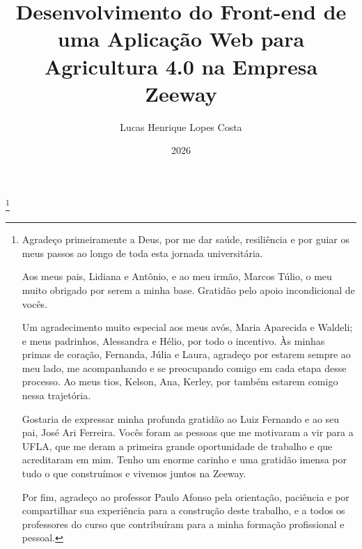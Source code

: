 \documentclass{templufla}
\author{Lucas Henrique Lopes Costa}
\title{Desenvolvimento do Front-end de uma Aplicação Web para Agricultura 4.0 na Empresa Zeeway}
\date{2026}
\begin{document}

\maketitle


\thanks{
Agradeço primeiramente a Deus, por me dar saúde, resiliência e por guiar os meus passos ao longo de toda esta jornada universitária.

Aos meus pais, Lidiana e Antônio, e ao meu irmão, Marcos Túlio, o meu muito obrigado por serem a minha base. Gratidão pelo apoio incondicional de vocês.

Um agradecimento muito especial aos meus avós, Maria Aparecida e Waldeli; e meus padrinhos, Alessandra e Hélio, por todo o incentivo. Às minhas primas de coração, Fernanda, Júlia e Laura, agradeço por estarem sempre ao meu lado, me acompanhando e se preocupando comigo em cada etapa desse processo. Ao meus tios, Kelson, Ana, Kerley, por também estarem comigo nessa trajetória.

Gostaria de expressar minha profunda gratidão ao Luiz Fernando e ao seu pai, José Ari Ferreira. Vocês foram as pessoas que me motivaram a vir para a UFLA, que me deram a primeira grande oportunidade de trabalho e que acreditaram em mim. Tenho um enorme carinho e uma gratidão imensa por tudo o que construímos e vivemos juntos na Zeeway.

Por fim, agradeço ao professor Paulo Afonso pela orientação, paciência e por compartilhar sua experiência para a construção deste trabalho, e a todos os professores do curso que contribuíram para a minha formação profissional e pessoal.}
\end{document}
